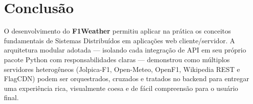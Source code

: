 \documentclass[12pt]{article}
\begin{document}
\section{Conclusão}

O desenvolvimento do \textbf{F1Weather} permitiu aplicar na prática os conceitos fundamentais de Sistemas Distribuídos em aplicações web cliente/servidor. A arquitetura modular adotada — isolando cada integração de API em seu próprio pacote Python com responsabilidades claras — demonstrou como múltiplos servidores heterogêneos (Jolpica-F1, Open-Meteo, OpenF1, Wikipedia REST e FlagCDN) podem ser orquestrados, cruzados e tratados no backend para entregar uma experiência rica, visualmente coesa e de fácil compreensão para o usuário final.
\end{document}
